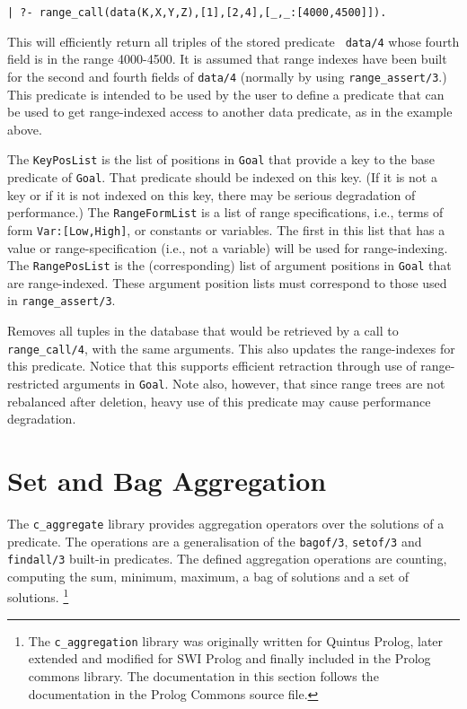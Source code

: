 \begin{description}
\begin{verbatim}
| ?- range_call(data(K,X,Y,Z),[1],[2,4],[_,_:[4000,4500]]).
\end{verbatim}

This will efficiently return all triples of the stored predicate {\tt
  data/4} whose fourth field is in the range 4000-4500.  It is assumed
that range indexes have been built for the second and fourth fields of
{\tt data/4} (normally by using {\tt range\_assert/3}.)  This
predicate is intended to be used by the user to define a predicate
that can be used to get range-indexed access to another data
predicate, as in the example above.

The {\tt KeyPosList} is the list of positions in {\tt Goal} that
provide a key to the base predicate of {\tt Goal}.  That predicate
should be indexed on this key.  (If it is not a key or if it is not
indexed on this key, there may be serious degradation of performance.)
The {\tt RangeFormList} is a list of range specifications, i.e., terms
of form {\tt Var:[Low,High]}, or constants or variables.  The first in
this list that has a value or range-specification (i.e., not a
variable) will be used for range-indexing.  The {\tt RangePosList} is
the (corresponding) list of argument positions in {\tt Goal} that are
range-indexed.  These argument position lists must correspond to those
used in {\tt range\_assert/3}. 

%
Removes all tuples in the database that would be retrieved by a call
to {\tt range\_call/4}, with the same arguments.  This also updates
the range-indexes for this predicate.  Notice that this supports
efficient retraction through use of range-restricted arguments in
{\tt Goal}.  Note also, however, that since range trees are not
rebalanced after deletion, heavy use of this predicate may cause
performance degradation.  

\end{description}

\section{Set and Bag Aggregation} \label{sec:set-aggregation}

The {\tt c\_aggregate} library provides aggregation operators over the
solutions of a predicate. The operations are a generalisation of the
{\tt bagof/3}, {\tt setof/3} and {\tt findall/3} built-in
predicates. The defined aggregation operations are counting, computing
the sum, minimum, maximum, a bag of solutions and a set of
solutions. \footnote{The {\tt c\_aggregation} library was originally
  written for Quintus Prolog, later extended and modified for SWI
  Prolog and finally included in the Prolog commons library. The
  documentation in this section follows the documentation in the
  Prolog Commons source file.}

